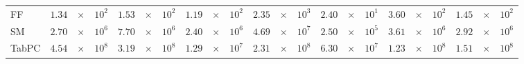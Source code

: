 \begin{table}[htbp]
{\begin{tabular}{
l
r@{}l@{}l
r@{}l@{}l
r@{}l@{}l
r@{}l@{}l
r@{}l@{}l
r@{}l@{}l
r@{}l@{}l
}
    \midrule
    FF & $1.34$ & $\times$ & $10^{2}$
 & $1.53$ & $\times$ & $10^{2}$
 & $1.19$ & $\times$ & $10^{2}$
 & $2.35$ & $\times$ & $10^{3}$
 & $2.40$ & $\times$ & $10^{1}$
 & $3.60$ & $\times$ & $10^{2}$
 & $1.45$ & $\times$ & $10^{2}$
 \\
    SM & $2.70$ & $\times$ & $10^{6}$
 & $7.70$ & $\times$ & $10^{6}$
 & $2.40$ & $\times$ & $10^{6}$
 & $4.69$ & $\times$ & $10^{7}$
 & $2.50$ & $\times$ & $10^{5}$
 & $3.61$ & $\times$ & $10^{6}$
 & $2.92$ & $\times$ & $10^{6}$
 \\
    TabPC & $4.54$ & $\times$ & $10^{8}$
 & $3.19$ & $\times$ & $10^{8}$
 & $1.29$ & $\times$ & $10^{7}$
 & $2.31$ & $\times$ & $10^{8}$
 & $6.30$ & $\times$ & $10^{7}$
 & $1.23$ & $\times$ & $10^{8}$
 & $1.51$ & $\times$ & $10^{8}$
 \\
    \bottomrule[1.0pt]
\end{tabular}}
\end{table}
